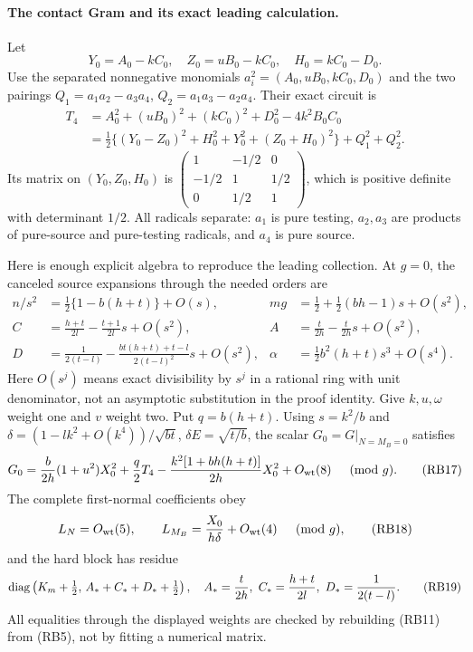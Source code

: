 \paragraph{The contact Gram and its exact leading calculation.}
Let
\[
 Y_0=A_0-kC_0,\quad Z_0=uB_0-kC_0,\quad H_0=kC_0-D_0.
\]
Use the separated nonnegative monomials $a_i^2=(A_0,uB_0,kC_0,D_0)$
and the two pairings $Q_1=a_1a_2-a_3a_4$,
$Q_2=a_1a_3-a_2a_4$. Their exact circuit is
\[
\begin{split}
 T_4&=A_0^2+(uB_0)^2+(kC_0)^2+D_0^2-4k^2B_0C_0\\
 &=\tfrac12\{(Y_0-Z_0)^2+H_0^2+Y_0^2+(Z_0+H_0)^2\}
                   +Q_1^2+Q_2^2.
\end{split}                                      \tag{RB15}
\]
Its matrix on $(Y_0,Z_0,H_0)$ is
$\left(\begin{smallmatrix}1&-1/2&0\\-1/2&1&1/2\\0&1/2&1\end{smallmatrix}\right)$,
which is positive definite with determinant $1/2$. All radicals
separate: $a_1$ is pure testing, $a_2,a_3$ are products of pure-source
and pure-testing radicals, and $a_4$ is pure source.

Here is enough explicit algebra to reproduce the leading collection.
At $g=0$, the canceled source expansions through the needed orders are
\[
\begin{aligned}
 n/s^2&=\tfrac12\{1-b(h+t)\}+O(s),&
 mg&=\tfrac12+\tfrac12(bh-1)s+O(s^2),\\
 C&=\frac{h+t}{2l}-\frac{t+1}{2l}s+O(s^2),&
 A&=\frac t{2h}-\frac t{2h}s+O(s^2),\\
 D&=\frac1{2(t-l)}-
       \frac{bt(h+t)+t-l}{2(t-l)^2}s+O(s^2),&
 \alpha&=\tfrac12 b^2(h+t)s^3+O(s^4).
\end{aligned}                                                     \tag{RB16}
\]
Here $O(s^j)$ means exact divisibility by $s^j$ in a rational ring with
unit denominator, not an asymptotic substitution in the proof identity.
Give $k,u,\omega$ weight one and $v$ weight two. Put $q=b(h+t)$.
Using $s=k^2/b$ and
$\delta=(1-lk^2+O(k^4))/\sqrt{bt}$, $\delta E=\sqrt{t/b}$,
the scalar $G_0=G|_{N=M_B=0}$ satisfies
\[
 G_0=\frac b{2h}(1+u^2)X_0^2+\frac q2T_4
       -\frac{k^2[1+bh(h+t)]}{2h}X_0^2+O_{\rm wt}(8)
       \quad\pmod g.                               \tag{RB17}
\]
The complete first-normal coefficients obey
\[
 L_N=O_{\rm wt}(5),\qquad
 L_{M_B}=\frac{X_0}{h\delta}+O_{\rm wt}(4)\quad\pmod g,
 \tag{RB18}
\]
and the hard block has residue
\[
 \operatorname{diag}\left(K_m+\tfrac12,\,
           A_*+C_*+D_*+\tfrac12\right),
 \quad A_*={t\over2h},\ C_*={h+t\over2l},\ D_*={1\over2(t-l)}.
 \tag{RB19}
\]
All equalities through the displayed weights are checked by rebuilding
(RB11) from (RB5), not by fitting a numerical matrix.

